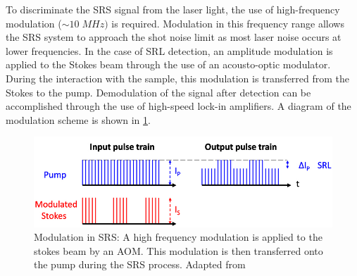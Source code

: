To discriminate the SRS signal from the laser light, the use of high-frequency modulation ($\sim10\;MHz)$ is required.  Modulation in this frequency range allows the SRS system to approach the shot noise limit as most laser noise occurs at lower frequencies.  In the case of SRL detection, an amplitude modulation is applied to the Stokes beam through the use of an acousto-optic modulator.  During the interaction with the sample, this modulation is transferred from the Stokes to the pump.  Demodulation of the signal after detection can be accomplished through the use of high-speed lock-in amplifiers. A diagram of the modulation scheme is shown in \ref{fig:mod}.

\begin{figure}[h]
    \centering
    \includegraphics[width=.8\linewidth]{Figures/SRSmodualtionScheme.jpg}
    \caption{Modulation in SRS:  A high frequency modulation is applied to the stokes beam by an AOM.  This modulation is then transferred onto the pump during the SRS process.  Adapted from \cite{Freudiger1857}}
    \label{fig:mod}
\end{figure}

